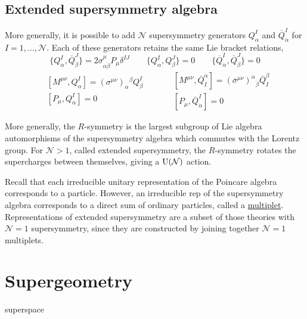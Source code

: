 \subsection{Extended supersymmetry algebra}
More generally, it is possible to add $\mathcal{N}$ supersymmetry generators
$Q^I_{\alpha}$ and $\overline{Q}_{\dot{\alpha}} ^{I}$ for
$I=1,\ldots,\mathcal{N}$. Each of these generators retains the same Lie bracket
relations,  
\[
	\{Q_\alpha^I,\overline{Q}^J_{\dot{\beta}}\} 
	= 2\sigma^{\mu}_{\alpha \dot{\beta}} P_{\mu} \delta^{IJ}
	\qquad
	\{Q_\alpha^I,Q_{\beta}^J\} = 0
	\qquad
	\{\overline{Q}_{\dot{\alpha}}^I, \overline{Q}_{\dot{\beta}}^J\} = 0 
\] 
\begin{equation*}
	\begin{split}
		&[M^{\mu\nu}, Q_{\alpha}^I] 
		= (\sigma^{\mu\nu})_{\alpha}{}^{\beta}Q_\beta^I \\
		&[P_{\mu}, Q_{\alpha}^I] 
		= 0 
	\end{split}
	\qquad
	\begin{split}
		&[M^{\mu\nu}, \overline{Q}^{\dot{\alpha}}_I] = 
		(\overline{\sigma}^{\mu\nu})^{\dot{\alpha}}{}_{\dot{\beta}}
		\overline{Q}^{\dot{\beta}}_I\\
		&[P_\mu, \overline{Q}_{\dot{\alpha}}^I] = 0
	\end{split}
\end{equation*}

More generally, the $R$-symmetry is the largest subgroup of Lie algebra
automorphisms of the supersymmetry algebra which commutes with the Lorentz
group.	For $\mathcal{N}>1$, called extended supersymmetry, 
the $R$-symmetry rotates the supercharges between
themselves, giving a  $\operatorname{U}(\mathcal{N})$ action. 

Recall that each irreducible unitary representation of the Poincare algebra corresponds to a
particle. However, an irreducible rep of the supersymmetry algebra corresponds
to a direct sum of ordinary particles, called a \underline{multiplet}.
Representations of extended supersymmetry are a subset of those theories with
$\mathcal{N}=1$ supersymmetry, since they are constructed by joining together
$\mathcal{N}=1$ multiplets.


\section{Supergeometry}

\begin{defn}
	superspace
\end{defn}

